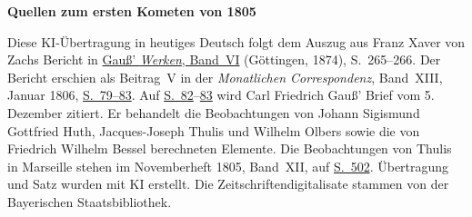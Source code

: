 \clearpage\thispagestyle{empty}
\begin{center}\textbf{Quellen zum ersten Kometen von 1805}\end{center}
\noindent Diese KI-Übertragung in heutiges Deutsch folgt dem Auszug aus Franz Xaver von Zachs Bericht in \href{https://gdz.sub.uni-goettingen.de/id/PPN236007467}{Gauß’ \textit{Werken}, Band~VI} (Göttingen, 1874), S.~265--266. Der Bericht erschien als Beitrag~V in der \textit{Monatlichen Correspondenz}, Band~XIII, Januar 1806, \href{https://www.digitale-sammlungen.de/en/view/bsb10538605?page=87}{S.~79--83}. Auf \href{https://www.digitale-sammlungen.de/en/view/bsb10538605?page=90}{S.~82}--\href{https://www.digitale-sammlungen.de/en/view/bsb10538605?page=91}{83} wird Carl Friedrich Gauß’ Brief vom 5. Dezember zitiert. Er behandelt die Beobachtungen von Johann Sigismund Gottfried Huth, Jacques-Joseph Thulis und Wilhelm Olbers sowie die von Friedrich Wilhelm Bessel berechneten Elemente. Die Beobachtungen von Thulis in Marseille stehen im Novemberheft 1805, Band~XII, auf \href{https://www.digitale-sammlungen.de/en/view/bsb10538604?page=518}{S.~502}. Übertragung und Satz wurden mit KI erstellt. Die Zeitschriftendigitalisate stammen von der Bayerischen Staatsbibliothek.
\clearpage
